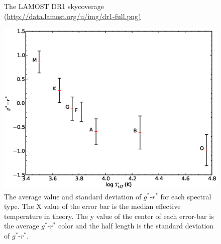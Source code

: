 \documentclass[manuscript]{aastex}
\begin{document}
 \begin{figure}
   \centering
   \caption{The LAMOST DR1 skycoverage (\url{http://data.lamost.org/u/img/dr1-full.png)}
   }
   \label{Fig_all}
   \end{figure}

   \begin{figure}
   \centering
   \includegraphics[width=16cm, angle=0,clip]{f5.eps}
   \caption{The average value and standard deviation of $g^*$-$r^*$ for  each spectral type.
    The X value of  the error bar is the median effective temperature in theory.
   The y value of the center of each error-bar is the average  $g^*$-$r^*$ color and the half length is the standard deviation of $g^*$-$r^*$.
   }
   \label{Fig1}
   \end{figure}
\end{document}
